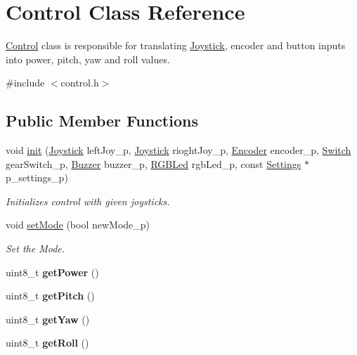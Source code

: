 \hypertarget{class_control}{}\section{Control Class Reference}
\label{class_control}


\hyperlink{class_control}{Control} class is responsible for translating \hyperlink{class_joystick}{Joystick}, encoder and button inputs into power, pitch, yaw and roll values.  




{\ttfamily \#include $<$control.\+h$>$}

\subsection*{Public Member Functions}
\begin{DoxyCompactItemize}
\item 
void \hyperlink{class_control_a435c342eba3a2598f3eb40e68fa1a263}{init} (\hyperlink{class_joystick}{Joystick} left\+Joy\+\_\+p, \hyperlink{class_joystick}{Joystick} rioght\+Joy\+\_\+p, \hyperlink{class_encoder}{Encoder} encoder\+\_\+p, \hyperlink{class_switch}{Switch} gear\+Switch\+\_\+p, \hyperlink{class_buzzer}{Buzzer} buzzer\+\_\+p, \hyperlink{class_r_g_b_led}{R\+G\+B\+Led} rgb\+Led\+\_\+p, const \hyperlink{class_settings}{Settings} $\ast$p\+\_\+settings\+\_\+p)
\begin{DoxyCompactList}\small\item\em Initializes control with given joysticks. \end{DoxyCompactList}\item 
void \hyperlink{class_control_af7a1f77ddc2789d291e3193cfc046d50}{set\+Mode} (bool new\+Mode\+\_\+p)
\begin{DoxyCompactList}\small\item\em Set the Mode. \end{DoxyCompactList}\item 
\mbox{\label{class_control_ad131914c5deeb07146127a63010480b9}} 
uint8\+\_\+t {\bfseries get\+Power} ()
\item 
\mbox{\label{class_control_a3ebc07bf6326015a022e36eed5f431be}} 
uint8\+\_\+t {\bfseries get\+Pitch} ()
\item 
\mbox{\label{class_control_a32c3d788dfca94d73df07ef3429f222d}} 
uint8\+\_\+t {\bfseries get\+Yaw} ()
\item 
\mbox{\label{class_control_abf3709324d98b6dc8d52649af5d8df38}} 
uint8\+\_\+t {\bfseries get\+Roll} ()
\end{DoxyCompactItemize}


